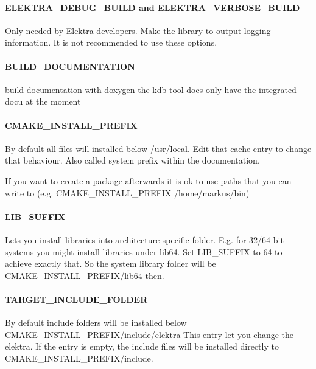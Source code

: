 \paragraph*{E\+L\+E\+K\+T\+R\+A\+\_\+\+D\+E\+B\+U\+G\+\_\+\+B\+U\+I\+L\+D and E\+L\+E\+K\+T\+R\+A\+\_\+\+V\+E\+R\+B\+O\+S\+E\+\_\+\+B\+U\+I\+L\+D}

Only needed by Elektra developers. Make the library to output logging information. It is not recommended to use these options.

\paragraph*{B\+U\+I\+L\+D\+\_\+\+D\+O\+C\+U\+M\+E\+N\+T\+A\+T\+I\+O\+N}

build documentation with doxygen the kdb tool does only have the integrated docu at the moment

\paragraph*{C\+M\+A\+K\+E\+\_\+\+I\+N\+S\+T\+A\+L\+L\+\_\+\+P\+R\+E\+F\+I\+X}

By default all files will installed below /usr/local. Edit that cache entry to change that behaviour. Also called system prefix within the documentation.

If you want to create a package afterwards it is ok to use paths that you can write to (e.\+g. C\+M\+A\+K\+E\+\_\+\+I\+N\+S\+T\+A\+L\+L\+\_\+\+P\+R\+E\+F\+I\+X /home/markus/bin)

\paragraph*{L\+I\+B\+\_\+\+S\+U\+F\+F\+I\+X}

Lets you install libraries into architecture specific folder. E.\+g. for 32/64 bit systems you might install libraries under lib64. Set L\+I\+B\+\_\+\+S\+U\+F\+F\+I\+X to 64 to achieve exactly that. So the system library folder will be C\+M\+A\+K\+E\+\_\+\+I\+N\+S\+T\+A\+L\+L\+\_\+\+P\+R\+E\+F\+I\+X/lib64 then.

\paragraph*{T\+A\+R\+G\+E\+T\+\_\+\+I\+N\+C\+L\+U\+D\+E\+\_\+\+F\+O\+L\+D\+E\+R}

By default include folders will be installed below C\+M\+A\+K\+E\+\_\+\+I\+N\+S\+T\+A\+L\+L\+\_\+\+P\+R\+E\+F\+I\+X/include/elektra This entry let you change the elektra. If the entry is empty, the include files will be installed directly to C\+M\+A\+K\+E\+\_\+\+I\+N\+S\+T\+A\+L\+L\+\_\+\+P\+R\+E\+F\+I\+X/include.


